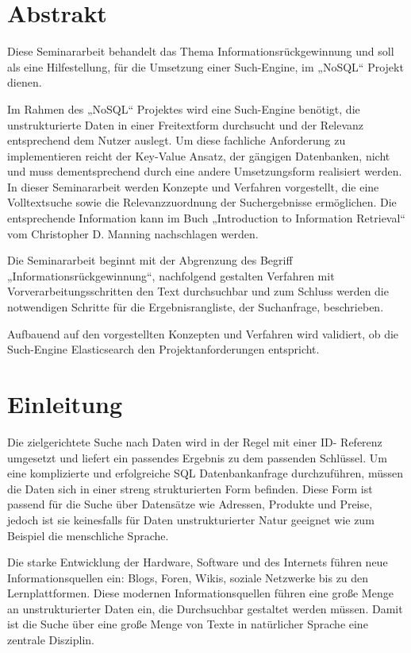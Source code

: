 \section[Abstrakt ]{Abstrakt }



Diese Seminararbeit behandelt das Thema Informationsrückgewinnung und
soll als eine Hilfestellung, für die Umsetzung einer Such-Engine, im
„NoSQL“ Projekt dienen. 

Im Rahmen des „NoSQL“ Projektes wird eine Such-Engine benötigt, die
unstrukturierte Daten in einer Freitextform durchsucht und der Relevanz
entsprechend dem Nutzer auslegt. Um diese fachliche Anforderung zu
implementieren reicht der Key-Value Ansatz, der gängigen Datenbanken,
nicht und muss dementsprechend durch eine andere Umsetzungsform
realisiert werden. In dieser Seminararbeit werden Konzepte und
Verfahren vorgestellt, die eine Volltextsuche sowie die
Relevanzzuordnung der Suchergebnisse ermöglichen. Die entsprechende
Information kann im Buch „Introduction to Information Retrieval“ vom
Christopher D. Manning nachschlagen werden.

Die Seminararbeit beginnt mit der Abgrenzung des Begriff
„Informationsrückgewinnung“, nachfolgend gestalten Verfahren mit
Vorverarbeitungsschritten den Text durchsuchbar und zum Schluss werden
die notwendigen Schritte für die Ergebnisrangliste, der Suchanfrage,
beschrieben. 

Aufbauend auf den vorgestellten Konzepten und Verfahren wird validiert,
ob die Such-Engine {\textquotedbl}Elasticsearch{\textquotedbl} den
Projektanforderungen entspricht.




\section[Einleitung]{Einleitung}



Die zielgerichtete Suche nach Daten wird in der Regel mit einer ID-
Referenz umgesetzt und liefert ein passendes Ergebnis zu dem passenden
Schlüssel. Um eine komplizierte und erfolgreiche SQL Datenbankanfrage
durchzuführen, müssen die Daten sich in einer streng strukturierten
Form befinden. Diese Form ist passend für die Suche über Datensätze wie
Adressen, Produkte und Preise, jedoch ist sie keinesfalls für Daten
unstrukturierter Natur geeignet %
wie zum Beispiel die menschliche Sprache.

Die starke Entwicklung der Hardware, Software und des Internets führen
neue Informationsquellen ein: Blogs, Foren, Wikis, soziale Netzwerke
bis zu den Lernplattformen. Diese modernen Informationsquellen führen
eine große Menge an unstrukturierter Daten ein, die Durchsuchbar
gestaltet werden müssen. Damit ist die Suche über eine große Menge von
Texte in natürlicher Sprache eine zentrale Disziplin. 




